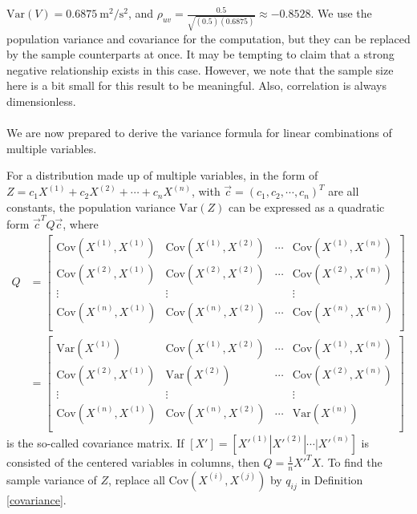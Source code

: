 $\text{Var}(V) = \SI{0.6875}{\square\m \per \square\s}$, and $\rho_{uv} = \frac{0.5}{\sqrt{(0.5)(0.6875)}} \approx -0.8528$. We use the population variance and covariance for the computation, but they can be replaced by the sample counterparts at once. It may be tempting to claim that a strong negative relationship exists in this case. However, we note that the sample size here is a bit small for this result to be meaningful. Also, correlation is always dimensionless.\\
\\
We are now prepared to derive the variance formula for linear combinations of multiple variables.
\begin{proper}
\label{variancemul}
For a distribution made up of multiple variables, in the form of $Z = c_1X^{(1)} + c_2X^{(2)} + \cdots + c_nX^{(n)}$, with $\vec{c} = (c_1, c_2, \cdots, c_n)^T$ are all constants, the population variance $\text{Var}(Z)$ can be expressed as a quadratic form $\vec{c}^TQ\vec{c}$, where
\begin{align*}
Q &=
\begin{bmatrix}
\text{Cov}(X^{(1)}, X^{(1)}) & \text{Cov}(X^{(1)}, X^{(2)}) & \cdots & \text{Cov}(X^{(1)}, X^{(n)}) \\
\text{Cov}(X^{(2)}, X^{(1)}) & \text{Cov}(X^{(2)}, X^{(2)}) & \cdots & \text{Cov}(X^{(2)}, X^{(n)}) \\
\vdots & \vdots &  & \vdots \\
\text{Cov}(X^{(n)}, X^{(1)}) & \text{Cov}(X^{(n)}, X^{(2)}) & \cdots & \text{Cov}(X^{(n)}, X^{(n)}) \\
\end{bmatrix} \\
&=
\begin{bmatrix}
\text{Var}(X^{(1)}) & \text{Cov}(X^{(1)}, X^{(2)}) & \cdots & \text{Cov}(X^{(1)}, X^{(n)}) \\
\text{Cov}(X^{(2)}, X^{(1)}) & \text{Var}(X^{(2)}) & \cdots & \text{Cov}(X^{(2)}, X^{(n)}) \\
\vdots & \vdots &  & \vdots \\
\text{Cov}(X^{(n)}, X^{(1)}) & \text{Cov}(X^{(n)}, X^{(2)}) & \cdots & \text{Var}(X^{(n)}) \\
\end{bmatrix} 
\end{align*}
is the so-called covariance matrix. If $[X'] = [X'^{(1)}|X'^{(2)}|\cdots|X'^{(n)}]$ is consisted of the centered variables in columns, then $Q = \frac{1}{n}X'^TX$. To find the sample variance of $Z$, replace all $\text{Cov}(X^{(i)}, X^{(j)})$ by $q_{ij}$ in Definition \ref{covariance}.

\end{proper}
